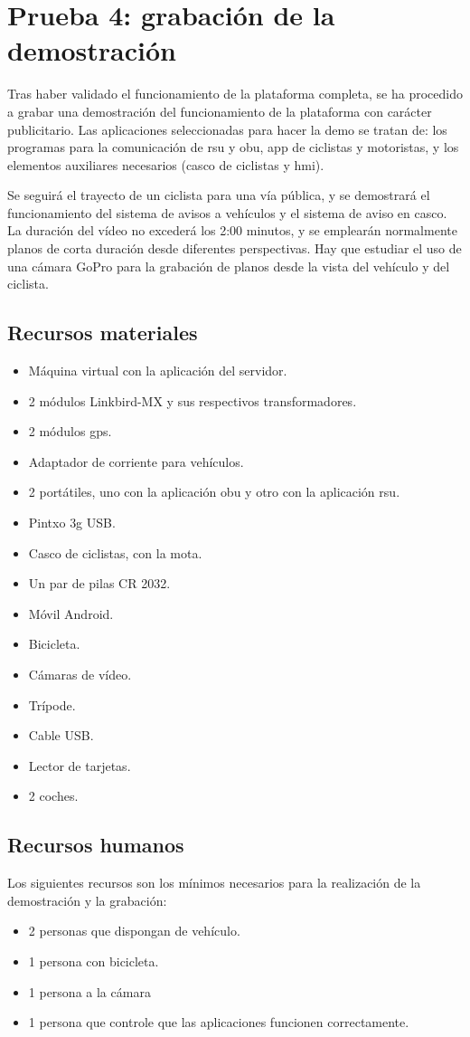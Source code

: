 \section{Prueba 4: grabación de la demostración}
Tras haber validado el funcionamiento de la plataforma completa, se ha procedido
a grabar una demostración del funcionamiento de la plataforma con carácter
publicitario. Las aplicaciones seleccionadas para hacer la demo se tratan de: los
programas para la comunicación de \gls{rsu} y \gls{obu}, app de ciclistas y motoristas, y los 
elementos auxiliares necesarios (casco de ciclistas y \gls{hmi}). 

Se seguirá el trayecto de un ciclista para una vía pública, y se demostrará el
funcionamiento del sistema de avisos a vehículos y el sistema de aviso en casco.
La duración del vídeo no excederá los 2:00 minutos, y se emplearán normalmente
planos de corta duración desde diferentes perspectivas. Hay que estudiar el uso
de una cámara GoPro para la grabación de planos desde la vista del vehículo y
del ciclista.

\subsection{Recursos materiales}
\begin{itemize}
	\item Máquina virtual con la aplicación del servidor.
	\item 2 módulos Linkbird-MX y sus respectivos transformadores.
	\item 2 módulos \gls{gps}.
	\item Adaptador de corriente para vehículos.
	\item 2 portátiles, uno con la aplicación \gls{obu} y otro con la aplicación \gls{rsu}.
	\item Pintxo \gls{3g} USB.
	\item Casco de ciclistas, con la mota.
	\item Un par de pilas CR 2032.
	\item Móvil Android.
	\item Bicicleta.
	\item Cámaras de vídeo.
	\item Trípode.
	\item Cable USB.
	\item Lector de tarjetas.
	\item 2 coches.
\end{itemize}

\subsection{Recursos humanos}
Los siguientes recursos son los mínimos necesarios para la realización de la
demostración y la grabación:
\begin{itemize}
	\item 2 personas que dispongan de vehículo.
	\item 1 persona con bicicleta.
	\item 1 persona a la cámara
	\item 1 persona que controle que las aplicaciones funcionen correctamente.
\end{itemize}

